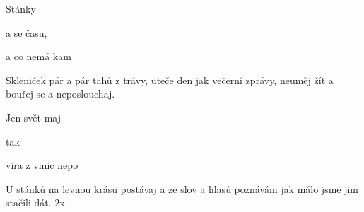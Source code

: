 \begin{TEXT}{Stánky}


\SLOKA {} \NL

    a  se času,\NL

    a  co nemá kam 

\SLOKA Skleniček pár a pár tahů z trávy,\NL
uteče den jak večerní zprávy,\NL
neuměj žít a bouřej se a neposlouchaj.


\REFREN Jen  svět maj \NL

   tak  \NL

    víra  z vinic nepo

\SLOKA U stánků na levnou krásu\NL
   postávaj a ze slov a hlasů\NL
   poznávám jak málo jsme jim stačili dát.
\REFRENHRAJ 2x
\end{TEXT}
